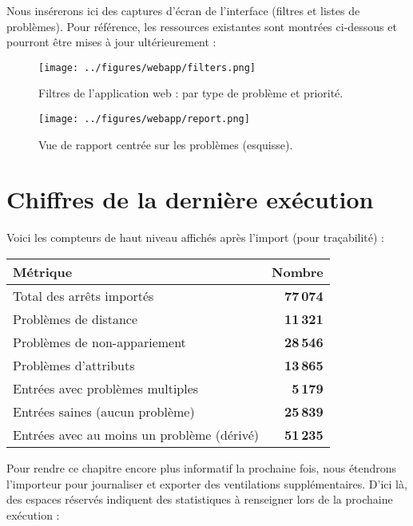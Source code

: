 \noindent Nous insérerons ici des captures d'écran de l'interface (filtres et listes de problèmes). Pour référence, les ressources existantes sont montrées ci-dessous et pourront être mises à jour ultérieurement :

\begin{figure}[h]
  \centering
  \texttt{[image: ../figures/webapp/filters.png]}
  \caption{Filtres de l'application web : par type de problème et priorité.}
\end{figure}

\begin{figure}[h]
  \centering
  \texttt{[image: ../figures/webapp/report.png]}
  \caption{Vue de rapport centrée sur les problèmes (esquisse).}
\end{figure}

\section{Chiffres de la dernière exécution}
Voici les compteurs de haut niveau affichés après l'import (pour traçabilité) :

\begin{center}
\small
\begin{tabular}{l r}
\toprule
Métrique & Nombre \\
\midrule
Total des arrêts importés & \textbf{77\,074} \\
Problèmes de distance & \textbf{11\,321} \\
Problèmes de non-appariement & \textbf{28\,546} \\
Problèmes d'attributs & \textbf{13\,865} \\
Entrées avec problèmes multiples & \textbf{5\,179} \\
Entrées saines (aucun problème) & \textbf{25\,839} \\
\midrule
Entrées avec au moins un problème (dérivé) & \textbf{51\,235} \\
\bottomrule
\end{tabular}
\end{center}

\noindent Pour rendre ce chapitre encore plus informatif la prochaine fois, nous étendrons l'importeur pour journaliser et exporter des ventilations supplémentaires. D'ici là, des espaces réservés indiquent des statistiques à renseigner lors de la prochaine exécution :

